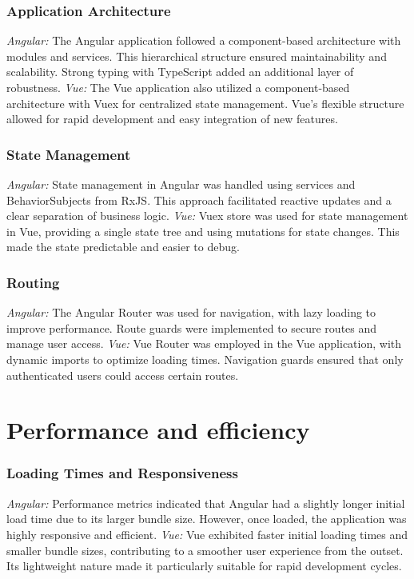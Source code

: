 \subsubsection{Application Architecture}
\textit{Angular: }The Angular application followed a component-based architecture with modules and services. This hierarchical structure ensured maintainability and scalability. Strong typing with TypeScript added an additional layer of robustness.
\newline\textit{Vue: }The Vue application also utilized a component-based architecture with Vuex for centralized state management. Vue's flexible structure allowed for rapid development and easy integration of new features.
\subsubsection{State Management}
\textit{Angular: }State management in Angular was handled using services and BehaviorSubjects from RxJS. This approach facilitated reactive updates and a clear separation of business logic.
\newline\textit{Vue: }Vuex store was used for state management in Vue, providing a single state tree and using mutations for state changes. This made the state predictable and easier to debug.
\subsubsection{Routing}
\textit{Angular: }The Angular Router was used for navigation, with lazy loading to improve performance. Route guards were implemented to secure routes and manage user access.
\newline\textit{Vue: }Vue Router was employed in the Vue application, with dynamic imports to optimize loading times. Navigation guards ensured that only authenticated users could access certain routes.

\section{Performance and efficiency}
\subsubsection{Loading Times and Responsiveness}
\textit{Angular: }Performance metrics indicated that Angular had a slightly longer initial load time due to its larger bundle size. However, once loaded, the application was highly responsive and efficient.
\newline\textit{Vue: }Vue exhibited faster initial loading times and smaller bundle sizes, contributing to a smoother user experience from the outset. Its lightweight nature made it particularly suitable for rapid development cycles.
